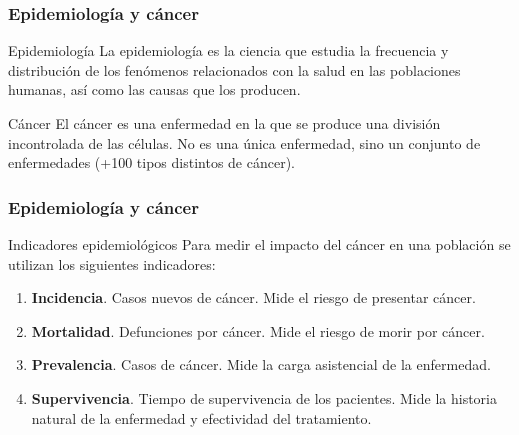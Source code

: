 \documentclass{beamer}
\begin{document}
\begin{frame}\frametitle{Epidemiología y cáncer}

	\begin{block}{Epidemiología}
		La epidemiología es la ciencia que estudia la frecuencia y distribución de los fenómenos relacionados con la salud en las poblaciones humanas, así como las causas que los producen.
	\end{block}

	\begin{block}{Cáncer}
		El cáncer es una enfermedad en la que se produce una división incontrolada de las células. No es una única enfermedad, sino un conjunto de enfermedades (+100 tipos distintos de cáncer).
	\end{block}

\end{frame}

\begin{frame}\frametitle{Epidemiología y cáncer}
		
	\begin{block}{Indicadores epidemiológicos}
		Para medir el impacto del cáncer en una población se utilizan los siguientes indicadores:\\
		\begin{enumerate}
			\item \textbf{Incidencia}. Casos nuevos de cáncer. Mide el riesgo de presentar cáncer.\\[2ex]
			\item \textbf{Mortalidad}. Defunciones por cáncer. Mide el riesgo de morir por cáncer.\\[2ex]
			\item \textbf{Prevalencia}. Casos de cáncer. Mide la carga asistencial de la enfermedad.\\[2ex]
			\item \textbf{Supervivencia}. Tiempo de supervivencia de los pacientes. Mide la historia natural de la enfermedad y efectividad del tratamiento. \\[2ex]
		\end{enumerate}
	\end{block}
	
\end{frame}

\end{document}
